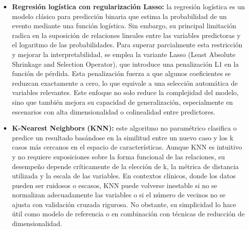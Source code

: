 \documentclass[12pt, letterpaper]{article}
\begin{document}
\begin{itemize}
    \item \textbf{Regresión logística con regularización Lasso:} la regresión logística es un modelo clásico para predicción binaria que estima la probabilidad de un evento mediante una función logística. Sin embargo, su principal limitación radica en la suposición de relaciones lineales entre las variables predictoras y el logaritmo de las probabilidades. Para superar parcialmente esta restricción y mejorar la interpretabilidad, se emplea la variante Lasso (Least Absolute Shrinkage and Selection Operator), que introduce una penalización L1 en la función de pérdida. Esta penalización fuerza a que algunos coeficientes se reduzcan exactamente a cero, lo que equivale a una selección automática de variables relevantes. Este enfoque no solo reduce la complejidad del modelo, sino que también mejora su capacidad de generalización, especialmente en escenarios con alta dimensionalidad o colinealidad entre predictores.

    \item \textbf{K-Nearest Neighbors (KNN):} este algoritmo no paramétrico clasifica o predice un resultado basándose en la similitud entre un nuevo caso y los k casos más cercanos en el espacio de características. Aunque KNN es intuitivo y no requiere suposiciones sobre la forma funcional de las relaciones, su desempeño depende críticamente de la elección de k, la métrica de distancia utilizada y la escala de las variables. En contextos clínicos, donde los datos pueden ser ruidosos o escasos, KNN puede volverse inestable si no se normalizan adecuadamente las variables o si el número de vecinos no se ajusta con validación cruzada rigurosa. No obstante, su simplicidad lo hace útil como modelo de referencia o en combinación con técnicas de reducción de dimensionalidad.


\end{itemize}
\end{document}
